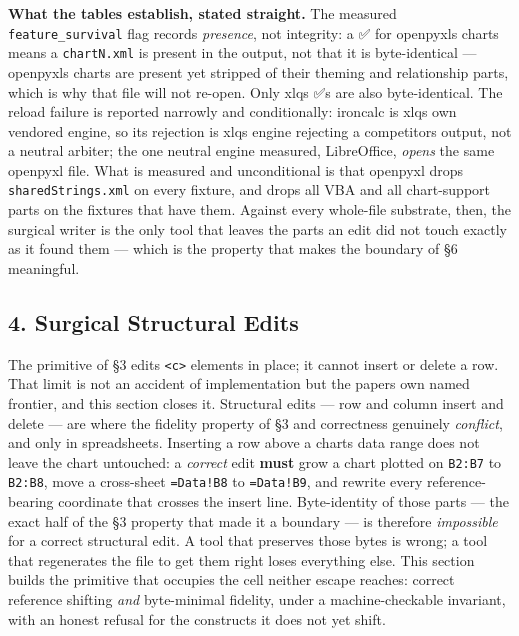 \documentclass[
]{article}
\begin{document}
\textbf{What the tables establish, stated straight.} The measured
\texttt{feature\_survival} flag records \emph{presence}, not integrity:
a ✅ for openpyxl\textquotesingle s charts means a \texttt{chartN.xml}
is present in the output, not that it is byte-identical ---
openpyxl\textquotesingle s charts are present yet stripped of their
theming and relationship parts, which is why that file will not re-open.
Only xlq\textquotesingle s ✅s are also byte-identical. The reload
failure is reported narrowly and conditionally: ironcalc is
xlq\textquotesingle s own vendored engine, so its rejection is
xlq\textquotesingle s engine rejecting a competitor\textquotesingle s
output, not a neutral arbiter; the one neutral engine measured,
LibreOffice, \emph{opens} the same openpyxl file. What is measured and
unconditional is that openpyxl drops \texttt{sharedStrings.xml} on every
fixture, and drops all VBA and all chart-support parts on the fixtures
that have them. Against every whole-file substrate, then, the surgical
writer is the only tool that leaves the parts an edit did not touch
exactly as it found them --- which is the property that makes the
boundary of §6 meaningful.

\subsection{4. Surgical Structural
Edits}\label{4-surgical-structural-edits}

The primitive of §3 edits \texttt{\textless{}c\textgreater{}} elements
in place; it cannot insert or delete a row. That limit is not an
accident of implementation but the paper\textquotesingle s own named
frontier, and this section closes it. Structural edits --- row and
column insert and delete --- are where the fidelity property of §3 and
correctness genuinely \emph{conflict}, and only in spreadsheets.
Inserting a row above a chart\textquotesingle s data range does not
leave the chart untouched: a \emph{correct} edit \textbf{must} grow a
chart plotted on \texttt{B2:B7} to \texttt{B2:B8}, move a cross-sheet
\texttt{=Data!B8} to \texttt{=Data!B9}, and rewrite every
reference-bearing coordinate that crosses the insert line. Byte-identity
of those parts --- the exact half of the §3 property that made it a
boundary --- is therefore \emph{impossible} for a correct structural
edit. A tool that preserves those bytes is wrong; a tool that
regenerates the file to get them right loses everything else. This
section builds the primitive that occupies the cell neither escape
reaches: correct reference shifting \emph{and} byte-minimal fidelity,
under a machine-checkable invariant, with an honest refusal for the
constructs it does not yet shift.
\end{document}
